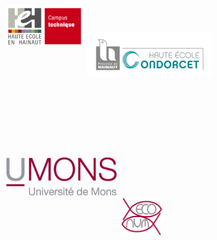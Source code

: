 \documentclass[]{report}
\title{}
\author{}
\date{}
\begin{document}
\begin{centering}

\begin{figure}

\includegraphics[width=3.5cm, height=6cm]{../image/technique-logo.jpg}
\includegraphics[width=5.5cm,height=3.5cm]{../image/condorcet.jpg}
\includegraphics[width=5cm,height=7cm]{../image/UMONS-logo.jpg}
\includegraphics[width=1.8cm,height=3.5cm]{../image/ECONUM-logo.pdf}

\end{figure}


\end{centering}
\end{document}
